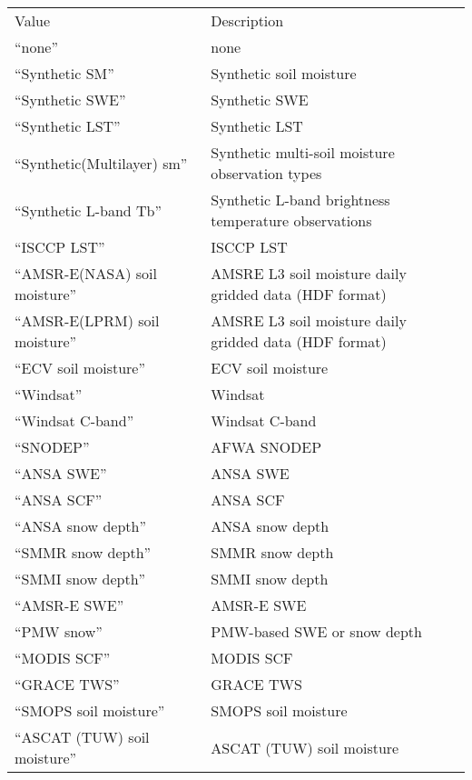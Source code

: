  \begin{tabular}{ll}
 Value                          & Description               \\
 ``none''                       & none                      \\
 
 ``Synthetic SM''               & Synthetic soil moisture   \\
 ``Synthetic SWE''              & Synthetic SWE             \\
 ``Synthetic LST''              & Synthetic LST             \\
 ``Synthetic(Multilayer) sm''   & Synthetic multi-soil moisture observation types \\
 ``Synthetic L-band Tb''        & Synthetic L-band brightness temperature observations       \\
 ``ISCCP LST''                  & ISCCP LST                 \\
 
 ``AMSR-E(NASA) soil moisture'' & AMSRE L3 soil moisture daily gridded data (HDF format) \\
 ``AMSR-E(LPRM) soil moisture'' & AMSRE L3 soil moisture daily gridded data (HDF format) \\
 ``ECV soil moisture''          & ECV soil moisture         \\
 ``Windsat''                    & Windsat                   \\
 
 ``Windsat C-band''             & Windsat C-band            \\
 ``SNODEP''                     & AFWA SNODEP               \\
 ``ANSA SWE''                   & ANSA SWE                  \\
 
 ``ANSA SCF''                   & ANSA SCF                  \\
 
 ``ANSA snow depth''            & ANSA snow depth           \\
 ``SMMR snow depth''            & SMMR snow depth           \\
 ``SMMI snow depth''            & SMMI snow depth           \\
 ``AMSR-E SWE''                 & AMSR-E SWE                \\
 
 ``PMW snow''                   & PMW-based SWE or snow depth  \\
 ``MODIS SCF''                  & MODIS SCF                 \\
 ``GRACE TWS''                  & GRACE TWS                 \\
 ``SMOPS soil moisture''        & SMOPS soil moisture    \\
 
 ``ASCAT (TUW) soil moisture''  & ASCAT (TUW) soil moisture \\
 
 \end{tabular}
 

